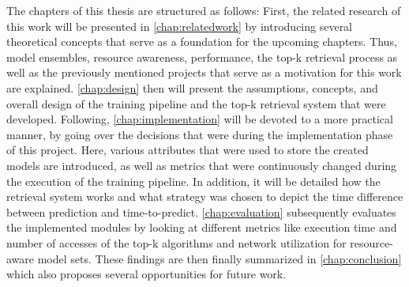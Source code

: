 The chapters of this thesis are structured as follows: First, the related research of this work will be presented in \autoref{chap:relatedwork} by introducing several theoretical concepts that serve as a foundation for the upcoming chapters. Thus, model ensembles, resource awareness, performance, the top-k retrieval process as well as the previously mentioned projects that serve as a motivation for this work are explained. \autoref{chap:design} then will present the assumptions, concepts, and overall design of the training pipeline and the top-k retrieval system that were developed. Following, \autoref{chap:implementation} will be devoted to a more practical manner, by going over the decisions that were during the implementation phase of this project. Here, various attributes that were used to store the created models are introduced, as well as metrics that were continuously changed during the execution of the training pipeline. In addition, it will be detailed how the retrieval system works and what strategy was chosen to depict the time difference between prediction and time-to-predict. \autoref{chap:evaluation} subsequently evaluates the implemented modules by looking at different metrics like execution time and number of accesses of the top-k algorithms and network utilization for resource-aware model sets. These findings are then finally summarized in \autoref{chap:conclusion} which also proposes several opportunities for future work.
